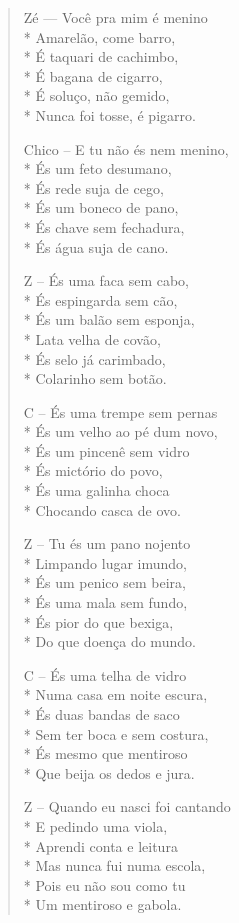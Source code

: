 \begin{verse}
Zé — Você pra mim é menino\\*
Amarelão, come barro,\\*
É taquari de cachimbo,\\*
É bagana de cigarro,\\*
É soluço, não gemido,\\*
Nunca foi tosse, é pigarro.

Chico – E tu não és nem menino,\\*
És um feto desumano,\\*
És rede suja de cego,\\*
És um boneco de pano,\\*
És chave sem fechadura,\\*
És água suja de cano.

Z – És uma faca sem cabo,\\*
És espingarda sem cão,\\*
És um balão sem esponja,\\*
Lata velha de covão,\\*
És selo já carimbado,\\*
Colarinho sem botão.

C – És uma trempe sem pernas\\*
És um velho ao pé dum novo,\\*
És um pincenê sem vidro\\*
És mictório do povo,\\*
És uma galinha choca\\*
Chocando casca de ovo.

Z – Tu és um pano nojento\\*
Limpando lugar imundo,\\*
És um penico sem beira,\\*
És uma mala sem fundo,\\*
És pior do que bexiga,\\*
Do que doença do mundo.

C – És uma telha de vidro\\*
Numa casa em noite escura,\\*
És duas bandas de saco\\*
Sem ter boca e sem costura,\\*
És mesmo que mentiroso\\*
Que beija os dedos e jura.

Z – Quando eu nasci foi cantando\\*
E pedindo uma viola,\\*
Aprendi conta e leitura\\*
Mas nunca fui numa escola,\\*
Pois eu não sou como tu\\*
Um mentiroso e gabola.


\end{verse}
